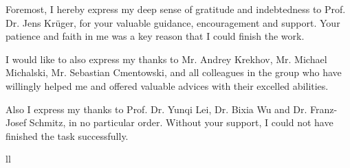 \documentclass[
11pt, %
oneside, %
english, %
singlespacing, %
parskip, %
headsepline, %
]{MastersDoctoralThesis} %
\begin{document}
\begin{acknowledgements}
\addchaptertocentry{\acknowledgementname} %
Foremost, I hereby express my deep sense of gratitude and indebtedness to Prof. Dr. Jens Krüger, for your valuable guidance, encouragement and support. Your patience and faith in me was a key reason that I could finish the work.

I would like to also express my thanks to Mr. Andrey Krekhov, Mr. Michael Michalski, Mr. Sebastian Cmentowski, and all colleagues in the group who have willingly helped me and offered valuable advices with their excelled abilities.

Also I express my thanks to Prof. Dr. Yunqi Lei, Dr. Bixia Wu and Dr. Franz-Josef Schmitz, in no particular order. Without your support, I could not have finished the task successfully.
\end{acknowledgements}


{
	\hypersetup{linkcolor = red!40!black}
	\tableofcontents %
}

{
	\hypersetup{linkcolor = red!30!black}
	\listoffigures %
}

{
	\hypersetup{linkcolor = red!25!black}
	\listoftables %
}

{
	\hypersetup{linkcolor = red!25!black}
	\listofalgorithms %
}


\begin{abbreviations}{ll} %


\end{abbreviations}
\end{document}
